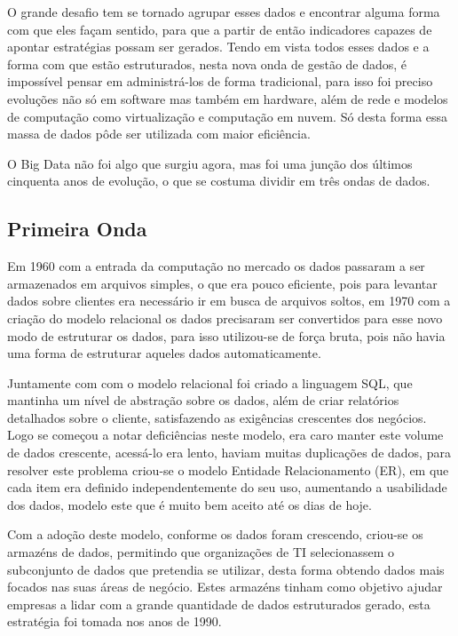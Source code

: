 O grande desafio tem se tornado agrupar esses dados e encontrar alguma forma com que eles façam sentido, para que a partir de então indicadores capazes de apontar estratégias possam ser gerados. Tendo em vista todos esses dados e a forma com que estão estruturados, nesta nova onda de gestão de dados, é impossível pensar em administrá-los de forma tradicional, para isso foi preciso evoluções não só em software mas também em hardware, além de rede e modelos de computação como virtualização e computação em nuvem. Só desta forma essa massa de dados pôde ser utilizada com maior eficiência.~\cite{leigos}

O Big Data não foi algo que surgiu agora, mas foi uma junção dos últimos cinquenta anos de evolução, o que se costuma dividir em três ondas de dados.

\subsection{Primeira Onda}
\label{subsec:primeiraonda}
Em 1960 com a entrada da computação no mercado os dados passaram a ser armazenados em arquivos simples, o que era pouco eficiente, pois para levantar dados sobre clientes era necessário ir em busca de arquivos soltos, em 1970 com a criação do modelo relacional os dados precisaram ser convertidos para esse novo modo de estruturar os dados, para isso utilizou-se de força bruta, pois não havia uma forma de estruturar aqueles dados automaticamente.

Juntamente com com o modelo relacional foi criado a linguagem SQL, que mantinha um nível de abstração sobre os dados, além de criar relatórios detalhados sobre o cliente, satisfazendo as exigências crescentes dos negócios. Logo se começou a notar deficiências neste modelo, era caro manter este volume de dados crescente, acessá-lo era lento, haviam muitas duplicações de dados, para resolver este problema criou-se o modelo Entidade Relacionamento (ER), em que cada item era definido independentemente do seu uso, aumentando a usabilidade dos dados, modelo este que é muito bem aceito até os dias de hoje.

Com a adoção deste modelo, conforme os dados foram crescendo, criou-se os armazéns de dados, permitindo que organizações de TI selecionassem o subconjunto de dados que pretendia se utilizar, desta forma obtendo dados mais focados nas suas áreas de negócio. Estes armazéns tinham como objetivo ajudar empresas a lidar com a grande quantidade de dados estruturados gerado, esta estratégia foi tomada nos anos de 1990.

